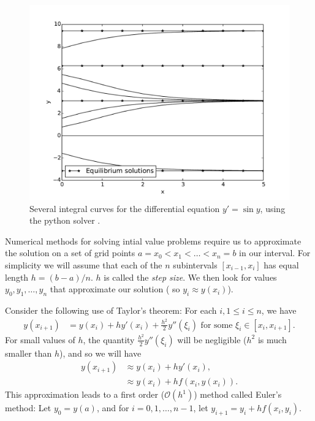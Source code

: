 \begin{figure}
\centering
\includegraphics[width=\textwidth]{Fig2.pdf}
\caption{Several integral curves for the differential equation $y' =\sin y$, using the python solver . }
\label{ivp:int_curves}
\end{figure}



Numerical methods for solving intial value problems require us to approximate the solution on a set of grid points $a = x_0< x_1<\hdots< x_n = b$ in our interval.  For simplicity we will assume that each of the $n$ subintervals $[x_{i-1},x_i]$ has equal length $h = (b-a)/n$. $h$ is called the \textit{step size}. We then look for values $y_0,y_1, \hdots, y_n$ that approximate our solution ( so $y_i \approx y(x_i)$).  

Consider the following use of Taylor's theorem: For each $i, 1 \leq i \leq n$, we have
\begin{align*}
y(x_{i+1}) &= y(x_{i}) + h y'(x_i) + \frac{h^2}{2} y''(\xi_i)\text{ for some }\xi_i \in [x_i,x_{i+1}].
\end{align*}
For small values of $h$, the quantity $\frac{h^2}{2} y''(\xi_i)$ will be negligible ($h^2$ is much smaller than $h$), and so we will have
\begin{align*}
y(x_{i+1}) &\approx y(x_{i}) + h y'(x_i)  ,\\
&\approx y(x_{i}) + h f(x_i,y(x_i)).
\end{align*}
This approximation leads to a first order ($\mathcal{O}(h^1)$) method called Euler's method: Let $y_0 = y(a)$, and for $i = 0, 1, \hdots, n-1$, let $y_{i+1} = y_i +hf(x_i,y_i)$. 


